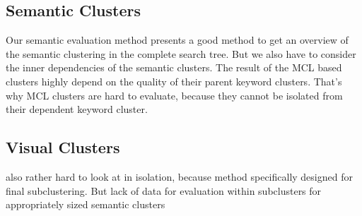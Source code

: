 \subsection{Semantic Clusters}
Our semantic evaluation method presents a good method to get an overview of the semantic clustering in the complete search tree. But we also have to consider the inner dependencies of the semantic clusters. The result of the MCL based clusters highly depend on the quality of their parent keyword clusters. That's why MCL clusters are hard to evaluate, because they cannot be isolated from their dependent keyword cluster.\\

\subsection{Visual Clusters}
also rather hard to look at in isolation, because method specifically designed for final subclustering. But lack of data for evaluation within subclusters for appropriately sized semantic clusters